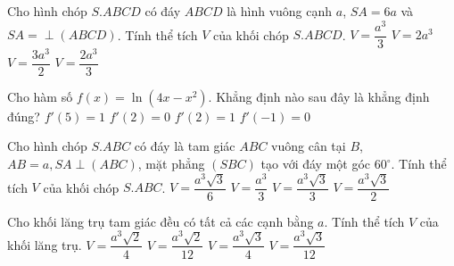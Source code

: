 \begin{ex}%
Cho hình chóp $S.ABCD$ có đáy $ABCD$ là hình vuông cạnh $a$, $SA=6a$ và $SA=\perp (ABCD)$. Tính thể tích $V$ của khối chóp $S.ABCD$.
\choice
{$V=\dfrac{a^3}{3}$}
{\True $V=2a^3$}
{$V=\dfrac{3a^3}{2}$}
{$V=\dfrac{2a^3}{3}$}
\end{ex}

\begin{ex}%
Cho hàm số $f(x)=\ln (4x-x^2)$. Khẳng định nào sau đây là khẳng định đúng?
\choice
{$f'(5)=1$}
{\True  $f'(2)=0$}
{$f'(2)=1$}
{$f'(-1)=0$}
\end{ex}

\begin{ex}%
Cho hình chóp $S.ABC$ có đáy là tam giác $ABC$ vuông cân tại $B$, $AB=a, SA\perp (ABC)$, mặt phẳng $(SBC)$ tạo với đáy một góc $60^\circ$. Tính thể tích $V$ của khối chóp $S.ABC$.
\choice
{\True  $V=\dfrac{a^3\sqrt{3}}{6}$}
{$V=\dfrac{a^3}{3}$}
{$V=\dfrac{a^3\sqrt{3}}{3}$}
{$V=\dfrac{a^3\sqrt{3}}{2}$}
\end{ex}

\begin{ex}%
Cho khối lăng trụ tam giác đều có tất cả các cạnh bằng $a$. Tính thể tích $V$ của khối lăng trụ.
\choice
{$V=\dfrac{a^3\sqrt{2}}{4}$}
{$V=\dfrac{a^3\sqrt{2}}{12}$}
{\True  $V=\dfrac{a^3\sqrt{3}}{4}$}
{$V=\dfrac{a^3\sqrt{3}}{12}$}
\end{ex}

